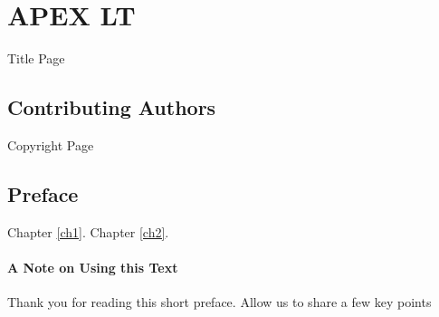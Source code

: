 \documentclass[openany]{book}
\begin{document}
\frontmatter
\tableofcontents
\part*{APEX LT}
Title Page
 \chapter*{Contributing Authors}
Copyright Page
\chapter*{Preface}
Chapter \ref{ch1}.  Chapter \ref{ch2}.
\subsection{A Note on Using this Text}

Thank you for reading this short preface. Allow us to share a few key points 
\end{document}
